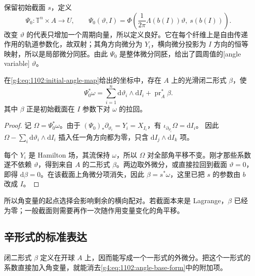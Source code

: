\ProseParagraphBreak

保留初始截面 \(s\)，定义
\begin{equation}\label{g4:eq:1102:initial-angle-map}
	\Psi_0:\mathbb T^n\times A\longrightarrow U,\qquad
	\Psi_0(\vartheta,I)
	=\Phi\left(\frac1{2\pi}\Lambda(b(I))\vartheta,\ s(b(I))\right).
\end{equation}
改变 \(\vartheta\) 的代表只增加一个周期向量，所以定义良好。它在每个纤维上是自由传递作用的轨道参数化，故双射；其角方向微分为 \(Y_i\)，横向微分投影为 \(I\) 方向的恒等映射，所以是局部微分同胚。由此 \(\Psi_0\) 是整体微分同胚，给出了圆周值的[angle variable] \(\vartheta\)。

\begin{proposition}\label{g4:prop:1102:angle-form}
	在\eqref{g4:eq:1102:initial-angle-map}给出的坐标中，存在 \(A\) 上的光滑闭二形式 \(\beta\)，使
	\begin{equation}\label{g4:eq:1102:angle-base-form}
		\Psi_0^*\omega
		=\sum_{i=1}^n\mathrm{d}\vartheta_i\wedge\mathrm{d}I_i
		+\operatorname{pr}_A^*\beta.
	\end{equation}
	其中 \(\beta\) 正是初始截面在 \(I\) 参数下对 \(\omega\) 的拉回。
\end{proposition}
\begin{proof}
	记 \(\Omega=\Psi_0^*\omega\)。由于 \((\Psi_0)_*\partial_{\vartheta_i}=Y_i=X_{I_i}\)，有
	\(\iota_{\partial_{\vartheta_i}}\Omega=\mathrm{d}I_i\)。
	因此
	\(\Omega-\sum_i\mathrm{d}\vartheta_i\wedge\mathrm{d}I_i\)
	插入任一角方向都为零，只含 \(\mathrm{d}I_j\wedge\mathrm{d}I_k\) 项。

	每个 \(Y_i\) 是 Hamilton 场，其流保持 \(\omega\)，所以 \(\Omega\) 对全部角平移不变。刚才那些系数遂不依赖 \(\vartheta\)，得到来自 \(A\) 的二形式 \(\beta\)。两边取外微分，或直接拉回到截面 \(\vartheta=0\)，即得 \(\mathrm{d}\beta=0\)。在该截面上角微分项消失，因此 \(\beta=s^*\omega\)，这里已把 \(s\) 的参数由 \(b\) 改成 \(I\)。
\end{proof}

所以角变量的起点选择会影响剩余的横向配对。若截面本来是 Lagrange，\(\beta\) 已经为零；一般截面则需要再作一次随作用变量变化的角平移。

\subsection{辛形式的标准表达}
\label{g4:subsec:1102:04}

闭二形式 \(\beta\) 定义在开球 \(A\) 上，因而能写成一个一形式的外微分。把这个一形式的系数直接加入角变量，就能消去\eqref{g4:eq:1102:angle-base-form}中的附加项。

